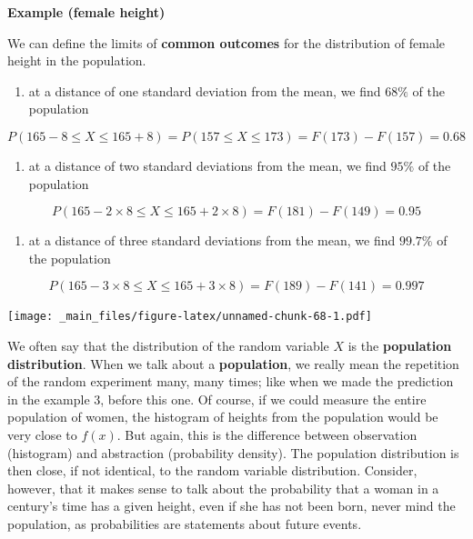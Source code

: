 \documentclass[
]{book}
\providecommand{\tightlist}{%
  \setlength{\itemsep}{0pt}\setlength{\parskip}{0pt}}
\begin{document}
\textbf{Example (female height)}

We can define the limits of \textbf{common outcomes} for the distribution of female height in the population.

\begin{enumerate}
\def\labelenumi{\arabic{enumi})}
\tightlist
\item
  at a distance of one standard deviation from the mean, we find \(68\%\) of the population
\end{enumerate}

\[P(165-8 \leq X \leq 165+8)=P(157 \leq X \leq 173)=F(173)-F(157)=0.68\]

\begin{enumerate}
\def\labelenumi{\arabic{enumi})}
\setcounter{enumi}{1}
\tightlist
\item
  at a distance of two standard deviations from the mean, we find \(95\%\) of the population
\end{enumerate}

\[P(165-2 \times 8 \leq X \leq 165+2\times 8)=F(181)-F(149)=0.95\]

\begin{enumerate}
\def\labelenumi{\arabic{enumi})}
\setcounter{enumi}{2}
\tightlist
\item
  at a distance of three standard deviations from the mean, we find \(99.7\%\) of the population
\end{enumerate}

\[P(165-3 \times 8 \leq X \leq 165+3\times 8)=F(189)-F(141)=0.997\]

\texttt{[image: \_main\_files/figure-latex/unnamed-chunk-68-1.pdf]}

We often say that the distribution of the random variable \(X\) is the \textbf{population distribution}. When we talk about a \textbf{population}, we really mean the repetition of the random experiment many, many times; like when we made the prediction in the example 3, before this one. Of course, if we could measure the entire population of women, the histogram of heights from the population would be very close to \(f(x)\). But again, this is the difference between observation (histogram) and abstraction (probability density). The population distribution is then close, if not identical, to the random variable distribution. Consider, however, that it makes sense to talk about the probability that a woman in a century's time has a given height, even if she has not been born, never mind the population, as probabilities are statements about future events.
\end{document}
